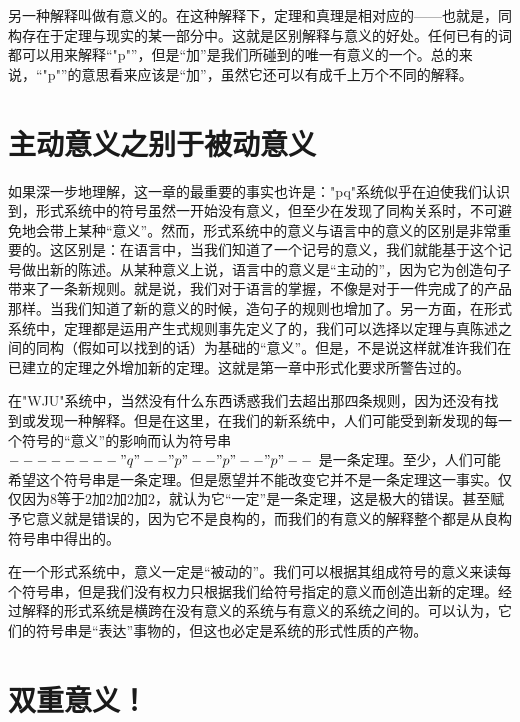 另一种解释叫做有意义的。在这种解释下，定理和真理是相对应的——也就是，同构存在于定理与现实的某一部分中。这就是区别解释与意义的好处。任何已有的词都可以用来解释“"p"”，但是“加”是我们所碰到的唯一有意义的一个。总的来说，“"p"”的意思看来应该是“加”，虽然它还可以有成千上万个不同的解释。

\section{主动意义之别于被动意义}

如果深一步地理解，这一章的最重要的事实也许是："pq"系统似乎在迫使我们认识到，形式系统中的符号虽然一开始没有意义，但至少在发现了同构关系时，不可避免地会带上某种“意义”。然而，形式系统中的意义与语言中的意义的区别是非常重要的。这区别是：在语言中，当我们知道了一个记号的意义，我们就能基于这个记号做出新的陈述。从某种意义上说，语言中的意义是“主动的”，因为它为创造句子带来了一条新规则。就是说，我们对于语言的掌握，不像是对于一件完成了的产品那样。当我们知道了新的意义的时候，造句子的规则也增加了。另一方面，在形式系统中，定理都是运用产生式规则事先定义了的，我们可以选择以定理与真陈述之间的同构（假如可以找到的话）为基础的“意义”。但是，不是说这样就准许我们在已建立的定理之外增加新的定理。这就是第一章中形式化要求所警告过的。

在"WJU"系统中，当然没有什么东西诱惑我们去超出那四条规则，因为还没有找到或发现一种解释。但是在这里，在我们的新系统中，人们可能受到新发现的每一个符号的“意义”的影响而认为符号串$--------"q"--"p"--"p"--"p"--$
是一条定理。至少，人们可能希望这个符号串是一条定理。但是愿望并不能改变它并不是一条定理这一事实。仅仅因为$8$等于$2$加$2$加$2$加$2$，就认为它“一定”是一条定理，这是极大的错误。甚至赋予它意义就是错误的，因为它不是良构的，而我们的有意义的解释整个都是从良构符号串中得出的。

在一个形式系统中，意义一定是“被动的”。我们可以根据其组成符号的意义来读每个符号串，但是我们没有权力只根据我们给符号指定的意义而创造出新的定理。经过解释的形式系统是横跨在没有意义的系统与有意义的系统之间的。可以认为，它们的符号串是“表达”事物的，但这也必定是系统的形式性质的产物。

\section{双重意义！}

